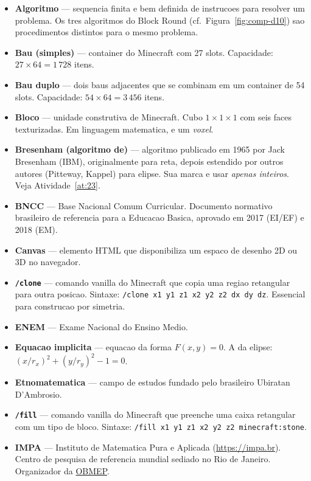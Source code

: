 \documentclass[12pt,a4paper]{scrartcl}
\newcommand{\code}[1]{\texttt{\small #1}}
\newcommand{\acc}[1]{\textcolor{accent}{\textbf{#1}}}
\newcommand{\cmd}[1]{\textcolor{earth}{\texttt{\small #1}}}
\begin{document}
\begin{itemize}[leftmargin=1.4em,itemsep=0.3em,topsep=0.3em]
  \item \acc{Algoritmo} --- sequencia finita e bem definida de instrucoes para resolver um problema. Os tres algoritmos do Block Round (cf.\ Figura~\ref{fig:comp-d10}) sao procedimentos distintos para o mesmo problema.
  \item \acc{Bau (simples)} --- container do Minecraft com 27 slots. Capacidade: $27 \times 64 = 1\,728$ itens.
  \item \acc{Bau duplo} --- dois baus adjacentes que se combinam em um container de 54 slots. Capacidade: $54 \times 64 = 3\,456$ itens.
  \item \acc{Bloco} --- unidade construtiva de Minecraft. Cubo $1\times1\times1$ com seis faces texturizadas. Em linguagem matematica, e um \emph{voxel}.
  \item \acc{Bresenham (algoritmo de)} --- algoritmo publicado em 1965 por Jack Bresenham (IBM), originalmente para reta, depois estendido por outros autores (Pitteway, Kappel) para elipse. Sua marca e usar \emph{apenas inteiros}. Veja Atividade~\ref{at:23}.
  \item \acc{BNCC} --- Base Nacional Comum Curricular. Documento normativo brasileiro de referencia para a Educacao Basica, aprovado em 2017 (EI/EF) e 2018 (EM).
  \item \acc{Canvas} --- elemento HTML que disponibiliza um espaco de desenho 2D ou 3D no navegador.
  \item \acc{\code{/clone}} --- comando vanilla do Minecraft que copia uma regiao retangular para outra posicao. Sintaxe: \cmd{/clone x1 y1 z1 x2 y2 z2 dx dy dz}. Essencial para construcao por simetria.
  \item \acc{ENEM} --- Exame Nacional do Ensino Medio.
  \item \acc{Equacao implicita} --- equacao da forma $F(x, y) = 0$. A da elipse: $(x/r_x)^2 + (y/r_y)^2 - 1 = 0$.
  \item \acc{Etnomatematica} --- campo de estudos fundado pelo brasileiro Ubiratan D'Ambrosio.
  \item \acc{\code{/fill}} --- comando vanilla do Minecraft que preenche uma caixa retangular com um tipo de bloco. Sintaxe: \cmd{/fill x1 y1 z1 x2 y2 z2 minecraft:stone}.
  \item \acc{IMPA} --- Instituto de Matematica Pura e Aplicada (\url{https://impa.br}). Centro de pesquisa de referencia mundial sediado no Rio de Janeiro. Organizador da \hyperref[sec:obmep]{OBMEP}.

\end{itemize}
\end{document}
